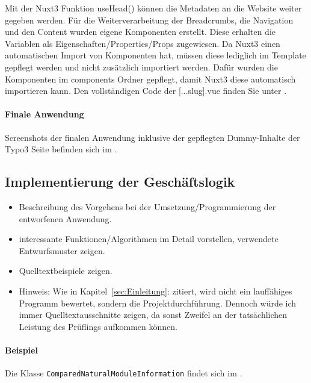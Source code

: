 Mit der Nuxt3 Funktion useHead() können die Metadaten an die Website weiter gegeben werden. Für die Weiterverarbeitung der Breadcrumbs, die Navigation und den Content wurden eigene Komponenten erstellt. Diese erhalten die Variablen als Eigenschaften/Properties/Props zugewiesen. Da Nuxt3 einen automatischen Import von Komponenten hat, müssen diese lediglich im Template gepflegt werden und nicht zusätzlich importiert werden. Dafür wurden die Komponenten im components Ordner gepflegt, damit Nuxt3 diese automatisch importieren kann. Den vollständigen Code der [...slug].vue finden Sie unter .

\paragraph{Finale Anwendung}
Screenshots der finalen Anwendung inklusive der gepflegten Dummy-Inhalte der Typo3 Seite befinden sich im .


\subsection{Implementierung der Geschäftslogik}
\label{sec:ImplementierungGeschaeftslogik}

\begin{itemize}
	\item Beschreibung des Vorgehens bei der Umsetzung/Programmierung der entworfenen Anwendung.
	\item \Ggfs interessante Funktionen/Algorithmen im Detail vorstellen, verwendete Entwurfsmuster zeigen.
	\item Quelltextbeispiele zeigen.
	\item Hinweis: Wie in Kapitel~\ref{sec:Einleitung}:  zitiert, wird nicht ein lauffähiges Programm bewertet, sondern die Projektdurchführung. Dennoch würde ich immer Quelltextausschnitte zeigen, da sonst Zweifel an der tatsächlichen Leistung des Prüflings aufkommen können.
\end{itemize}

\paragraph{Beispiel}
Die Klasse \texttt{Com\-par\-ed\-Na\-tu\-ral\-Mo\-dule\-In\-for\-ma\-tion} findet sich im .  

